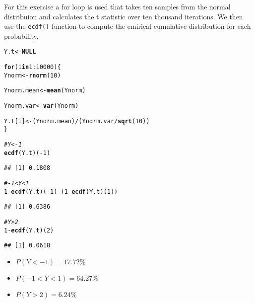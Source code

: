 \documentclass[12pt]{article}\usepackage[]{graphicx}\usepackage[]{color}
\makeatletter
\newcommand{\hlnum}[1]{\textcolor[rgb]{0.686,0.059,0.569}{#1}}%
\newcommand{\hlcom}[1]{\textcolor[rgb]{0.678,0.584,0.686}{\textit{#1}}}%
\newcommand{\hlopt}[1]{\textcolor[rgb]{0,0,0}{#1}}%
\newcommand{\hlstd}[1]{\textcolor[rgb]{0.345,0.345,0.345}{#1}}%
\newcommand{\hlkwa}[1]{\textcolor[rgb]{0.161,0.373,0.58}{\textbf{#1}}}%
\newcommand{\hlkwb}[1]{\textcolor[rgb]{0.69,0.353,0.396}{#1}}%
\newcommand{\hlkwd}[1]{\textcolor[rgb]{0.737,0.353,0.396}{\textbf{#1}}}%
\newenvironment{kframe}{%
 \def\at@end@of@kframe{}%
 \ifinner\ifhmode%
  \def\at@end@of@kframe{\end{minipage}}%
  \begin{minipage}{\columnwidth}%
 \fi\fi%
 \def\FrameCommand##1{\hskip\@totalleftmargin \hskip-\fboxsep
 \colorbox{shadecolor}{##1}\hskip-\fboxsep
     \hskip-\linewidth \hskip-\@totalleftmargin \hskip\columnwidth}%
 \MakeFramed {\advance\hsize-\width
   \@totalleftmargin\z@ \linewidth\hsize
   \@setminipage}}%
 {\par\unskip\endMakeFramed%
 \at@end@of@kframe}
\newenvironment{knitrout}{}{} %
\newenvironment{Answer}[2][Answer]{\begin{trivlist}
\item[\hskip \labelsep {\bfseries #1}\hskip \labelsep {\bfseries #2.}]}{\end{trivlist}}
\makeatother
\begin{document}
\begin{Answer}{1}

For this exercise a for loop is used that takes ten samples from the normal distribuion and calculates the t statistic over ten thousand iterations. We then use the \texttt{ecdf()} function to compute the emirical cumulative distribution for each probability.
\begin{knitrout}
\color{fgcolor}\begin{kframe}
\begin{alltt}
\hlstd{Y.t} \hlkwb{<-} \hlkwa{NULL}

\hlkwa{for} \hlstd{(i} \hlkwa{in} \hlnum{1}\hlopt{:}\hlnum{10000}\hlstd{) \{}
    \hlstd{Ynorm} \hlkwb{<-} \hlkwd{rnorm}\hlstd{(}\hlnum{10}\hlstd{)}

    \hlstd{Ynorm.mean} \hlkwb{<-} \hlkwd{mean}\hlstd{(Ynorm)}

    \hlstd{Ynorm.var} \hlkwb{<-} \hlkwd{var}\hlstd{(Ynorm)}

    \hlstd{Y.t[i]} \hlkwb{<-} \hlstd{(Ynorm.mean)}\hlopt{/}\hlstd{(Ynorm.var}\hlopt{/}\hlkwd{sqrt}\hlstd{(}\hlnum{10}\hlstd{))}
\hlstd{\}}

\hlcom{# Y < -1}
\hlkwd{ecdf}\hlstd{(Y.t)(}\hlopt{-}\hlnum{1}\hlstd{)}
\end{alltt}
\begin{verbatim}
## [1] 0.1808
\end{verbatim}
\begin{alltt}
\hlcom{# -1 < Y < 1}
\hlnum{1} \hlopt{-} \hlkwd{ecdf}\hlstd{(Y.t)(}\hlopt{-}\hlnum{1}\hlstd{)} \hlopt{-} \hlstd{(}\hlnum{1} \hlopt{-} \hlkwd{ecdf}\hlstd{(Y.t)(}\hlnum{1}\hlstd{))}
\end{alltt}
\begin{verbatim}
## [1] 0.6386
\end{verbatim}
\begin{alltt}
\hlcom{# Y > 2}
\hlnum{1} \hlopt{-} \hlkwd{ecdf}\hlstd{(Y.t)(}\hlnum{2}\hlstd{)}
\end{alltt}
\begin{verbatim}
## [1] 0.0618
\end{verbatim}
\end{kframe}
\end{knitrout}

\begin{itemize}
  \item $P(Y<-1)=17.72\%$
    \item $P(-1<Y<1)=64.27\%$
      \item $P(Y>2)=6.24\%$
\end{itemize}
\end{Answer}
\end{document}
